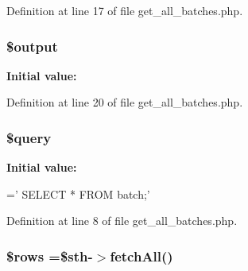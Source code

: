 Definition at line 17 of file get\-\_\-all\-\_\-batches.\-php.

\hypertarget{get__all__batches_8php_a73004ce9cd673c1bfafd1dc351134797}{
\subsubsection[{\$output}]{\setlength{\rightskip}{0pt plus 5cm}\$output}}\label{get__all__batches_8php_a73004ce9cd673c1bfafd1dc351134797}
{\bfseries Initial value\-:}


Definition at line 20 of file get\-\_\-all\-\_\-batches.\-php.

\hypertarget{get__all__batches_8php_af59a5f7cd609e592c41dc3643efd3c98}{
\subsubsection[{\$query}]{\setlength{\rightskip}{0pt plus 5cm}\$query}}\label{get__all__batches_8php_af59a5f7cd609e592c41dc3643efd3c98}
{\bfseries Initial value\-:}
\begin{DoxyCode}
=\textcolor{stringliteral}{'}
\textcolor{stringliteral}{    SELECT}
\textcolor{stringliteral}{        *}
\textcolor{stringliteral}{    FROM}
\textcolor{stringliteral}{        batch;'}
\end{DoxyCode}


Definition at line 8 of file get\-\_\-all\-\_\-batches.\-php.

\hypertarget{get__all__batches_8php_ace2ec39e7df3899fa8df9640ec274b03}{
\subsubsection[{\$rows}]{\setlength{\rightskip}{0pt plus 5cm}\$rows =\$sth-\/$>$fetch\-All()}}\label{get__all__batches_8php_ace2ec39e7df3899fa8df9640ec274b03}


